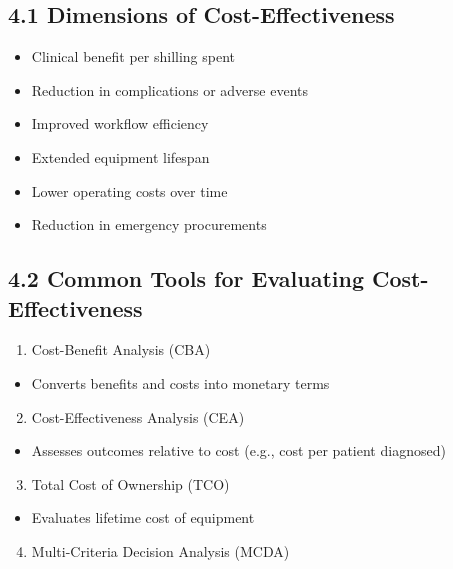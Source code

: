 \documentclass[10pt]{article}
\begin{document}
\subsection*{4.1 Dimensions of Cost-Effectiveness}
\begin{itemize}
  \item Clinical benefit per shilling spent
  \item Reduction in complications or adverse events
  \item Improved workflow efficiency
  \item Extended equipment lifespan
  \item Lower operating costs over time
  \item Reduction in emergency procurements
\end{itemize}

\subsection*{4.2 Common Tools for Evaluating Cost-Effectiveness}
\begin{enumerate}
  \item Cost-Benefit Analysis (CBA)
\end{enumerate}

\begin{itemize}
  \item Converts benefits and costs into monetary terms
\end{itemize}

\begin{enumerate}
  \setcounter{enumi}{1}
  \item Cost-Effectiveness Analysis (CEA)
\end{enumerate}

\begin{itemize}
  \item Assesses outcomes relative to cost (e.g., cost per patient diagnosed)
\end{itemize}

\begin{enumerate}
  \setcounter{enumi}{2}
  \item Total Cost of Ownership (TCO)
\end{enumerate}

\begin{itemize}
  \item Evaluates lifetime cost of equipment
\end{itemize}

\begin{enumerate}
  \setcounter{enumi}{3}
  \item Multi-Criteria Decision Analysis (MCDA)
\end{enumerate}
\end{document}
